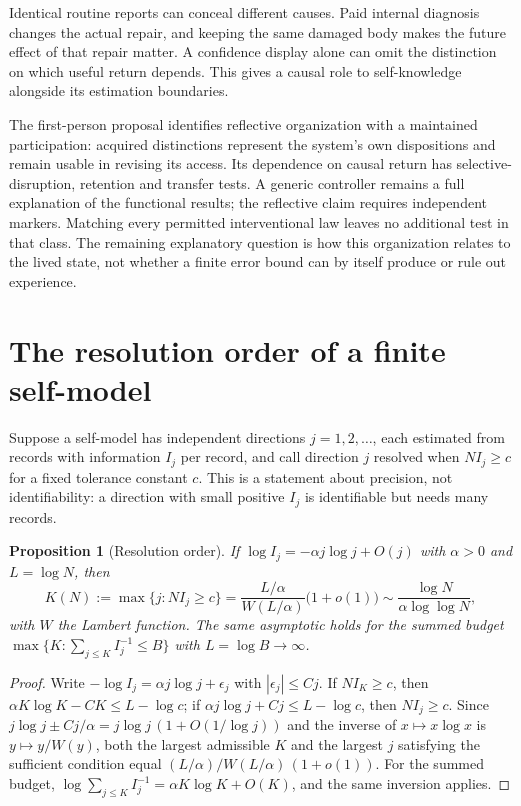 \documentclass[12pt]{article}
\newtheorem{proposition}[theorem]{Proposition}
\theoremstyle{definition}
\theoremstyle{remark}
\begin{document}
Identical routine reports can conceal different causes.
Paid internal diagnosis changes the actual repair, and keeping the
same damaged body makes the future effect of that repair matter.
A confidence display alone can omit the distinction on which useful
return depends. This gives a causal role to self-knowledge alongside
its estimation boundaries.

The first-person proposal identifies reflective organization with a
maintained participation: acquired distinctions represent the system's
own dispositions and remain usable in revising its access.
Its dependence on causal return has selective-disruption, retention
and transfer tests. A generic controller remains a full explanation
of the functional results; the reflective claim requires independent
markers. Matching every permitted interventional law leaves no
additional test in that class. The remaining explanatory question is
how this organization relates to the lived state, not whether a finite
error bound can by itself produce or rule out experience.

\appendix

\section{The resolution order of a finite self-model}\label{sec:horizon}

Suppose a self-model has independent directions $j=1,2,\dots$, each estimated from records with information $I_j$ per record, and call direction $j$ resolved when $NI_j\ge c$ for a fixed tolerance constant $c$. This is a statement about precision, not identifiability: a direction with small positive $I_j$ is identifiable but needs many records.

\begin{proposition}[Resolution order]\label{prop:horizon}
If $\log I_j=-\alpha j\log j+O(j)$ with $\alpha>0$ and $L=\log N$, then
\begin{equation}\label{eq:horizon}
K(N):=\max\{j:NI_j\ge c\}=\frac{L/\alpha}{W(L/\alpha)}\bigl(1+o(1)\bigr)\sim\frac{\log N}{\alpha\log\log N},
\end{equation}
with $W$ the Lambert function. The same asymptotic holds for the summed budget $\max\{K:\sum_{j\le K}I_j^{-1}\le B\}$ with $L=\log B\to\infty$.
\end{proposition}

\begin{proof}
Write $-\log I_j=\alpha j\log j+\epsilon_j$ with $|\epsilon_j|\le Cj$. If $NI_K\ge c$, then $\alpha K\log K-CK\le L-\log c$; if $\alpha j\log j+Cj\le L-\log c$, then $NI_j\ge c$. Since $j\log j\pm Cj/\alpha=j\log j\,(1+O(1/\log j))$ and the inverse of $x\mapsto x\log x$ is $y\mapsto y/W(y)$, both the largest admissible $K$ and the largest $j$ satisfying the sufficient condition equal $(L/\alpha)/W(L/\alpha)\,(1+o(1))$. For the summed budget, $\log\sum_{j\le K}I_j^{-1}=\alpha K\log K+O(K)$, and the same inversion applies.
\end{proof}
\end{document}
